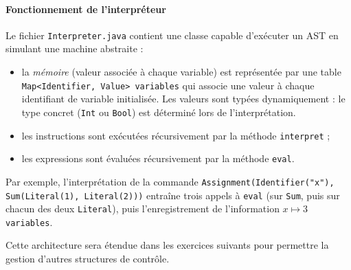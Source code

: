 \documentclass{td}
\begin{document}
\begin{exercice}
  \begin{center}
  \end{center}

  \paragraph{Fonctionnement de l'interpréteur}

  Le fichier \lstinline|Interpreter.java| contient une classe capable d'exécuter
  un AST en simulant une machine abstraite :

  \begin{itemize}
  \item la \emph{mémoire} (valeur associée à chaque variable)
    est représentée par une table \lstinline|Map<Identifier, Value> variables|
    qui associe une valeur à chaque identifiant de variable initialisée.
    Les valeurs sont typées dynamiquement : le type concret (\lstinline|Int| ou \lstinline|Bool|)
    est déterminé lors de l'interprétation.
  \item les instructions sont exécutées récursivement par
    la méthode \lstinline|interpret| ;
  \item les expressions sont évaluées récursivement par la méthode
    \lstinline|eval|.
  \end{itemize}

  Par exemple, l'interprétation de la commande
  \lstinline|Assignment(Identifier("x"), Sum(Literal(1), Literal(2)))|
  entraîne trois appels à \lstinline|eval| (sur \lstinline|Sum|, puis sur
  chacun des deux \lstinline|Literal|), puis l'enregistrement de l'information  $x \mapsto 3$
  \lstinline|variables|.

  Cette architecture sera étendue dans les exercices suivants pour permettre
  la gestion d'autres structures de contrôle.


\end{exercice}
\end{document}
